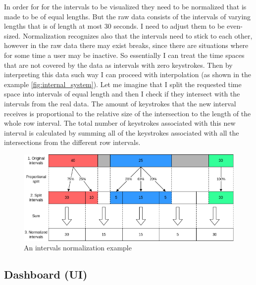 In order for for the intervals to be visualized they need to be normalized that is made to be of equal lengths. But the raw data consists of the intervals of varying lengths that is of length at most 30 seconds. I need to adjust them to be even-sized. Normalization recognizes also that the intervals need to stick to each other, however in the raw data there may exist breaks, since there are situations where for some time a user may be inactive. So essentially I can treat the time spaces that are not covered by the data as intervals with zero keystrokes. Then by interpreting this data such way I can proceed with interpolation (as shown in the example \ref{fig:internal_system}). Let me imagine that I split the requested time space into intervals of equal length and then I check if they intersect with the intervals from the real data. The amount of keystrokes that the new interval receives is proportional to the relative size of the intersection to the length of the whole row interval.
The total number of keystrokes associated with this new interval is calculated by summing all of the keystrokes associated with all the intersections from the different row intervals.

\begin{figure}[htbp]
  \centering
  \includegraphics[scale=0.5]{chapters/methodology/graphics/normalization.png}
  \caption{An intervals normalization example}
  \label{fig:normalization_example}
\end{figure}

\subsection{Dashboard (UI)}

